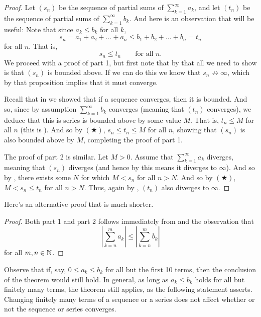 \begin{proof}
  Let $(s_n)$ be the sequence of partial sums of $\sum_{k =
  1}^{\infty} a_k$, and let $(t_n)$ be the sequence of partial sums
  of $\sum_{k = 1}^{\infty} b_k$. And here is an observation that
  will be useful:
  Note that since $a_k \leq b_k$ for all $k$,
  \[ s_n = a_1 + a_2 + \dots + a_n \leq b_1 + b_2 + \dots + b_n = t_n \]
  for all $n$. That is,
  \[ s_n \leq t_n \qquad \text{for all $n$.} \tag{$\bigstar$} \]
  We proceed with a proof of part 1, but first note that by
   that all we need to show
  is that $(s_n)$ is bounded above. If we can do this we know that
  $s_n \not\to \infty$, which by that proposition implies that it
  must converge.

  Recall that in  we showed that
  if a sequence converges, then it is bounded. And so, since by
  assumption $\sum_{k = 1}^{\infty} b_k$ converges (meaning that
  $(t_n)$ converges), we deduce that this is series is bounded above
  by some value $M$. That is, $t_n \leq M$ for all $n$ (this is
  ). And so by $(\bigstar)$, $s_n \leq t_n
  \leq M$ for all $n$, showing that $(s_n)$ is also bounded above by
  $M$, completing the proof of part 1.

  The proof of part 2 is similar. Let $M > 0$. Assume that $\sum_{k =
  1}^{\infty} a_k$ diverges, meaning that $(s_n)$ diverges (and hence
    by  this means it diverges
  to $\infty$). And so by , there exists
  some $N$ for which $M < s_n$ for all $n > N$. And so by
  $(\bigstar)$, $M < s_n \leq t_n$ for all $n > N$. Thus, again
  by , $(t_n)$ also diverges to $\infty$.
\end{proof}

Here's an alternative proof that is much shorter.

\begin{proof}
  Both part 1 and part 2 follows immediately from
   and the observation that
  \[ \left|\sum_{k = n}^{m} a_k\right| \leq \left|\sum_{k = n}^{m}
  b_k\right| \]
  for all $m, n \in \mathbb N$.
\end{proof}

\begin{remark}
  Observe that if, say, $0 \leq a_k \leq b_k$ for all but the first
  10 terms, then the conclusion of the theorem would still hold. In
  general, as long as $a_k \leq b_k$ holds for all but finitely many
  terms, the theorem still applies, as the following statement
  asserts. Changing finitely many terms of a sequence or a series
  does not affect whether or not the sequence or series converges.
\end{remark}

